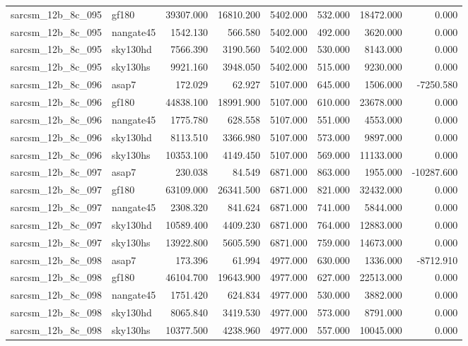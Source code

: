 \begin{tabular}{llrrrrrr}
sarcsm\_12b\_8c\_095 & gf180 & 39307.000 & 16810.200 & 5402.000 & 532.000 & 18472.000 & 0.000 \\
sarcsm\_12b\_8c\_095 & nangate45 & 1542.130 & 566.580 & 5402.000 & 492.000 & 3620.000 & 0.000 \\
sarcsm\_12b\_8c\_095 & sky130hd & 7566.390 & 3190.560 & 5402.000 & 530.000 & 8143.000 & 0.000 \\
sarcsm\_12b\_8c\_095 & sky130hs & 9921.160 & 3948.050 & 5402.000 & 515.000 & 9230.000 & 0.000 \\
sarcsm\_12b\_8c\_096 & asap7 & 172.029 & 62.927 & 5107.000 & 645.000 & 1506.000 & -7250.580 \\
sarcsm\_12b\_8c\_096 & gf180 & 44838.100 & 18991.900 & 5107.000 & 610.000 & 23678.000 & 0.000 \\
sarcsm\_12b\_8c\_096 & nangate45 & 1775.780 & 628.558 & 5107.000 & 551.000 & 4553.000 & 0.000 \\
sarcsm\_12b\_8c\_096 & sky130hd & 8113.510 & 3366.980 & 5107.000 & 573.000 & 9897.000 & 0.000 \\
sarcsm\_12b\_8c\_096 & sky130hs & 10353.100 & 4149.450 & 5107.000 & 569.000 & 11133.000 & 0.000 \\
sarcsm\_12b\_8c\_097 & asap7 & 230.038 & 84.549 & 6871.000 & 863.000 & 1955.000 & -10287.600 \\
sarcsm\_12b\_8c\_097 & gf180 & 63109.000 & 26341.500 & 6871.000 & 821.000 & 32432.000 & 0.000 \\
sarcsm\_12b\_8c\_097 & nangate45 & 2308.320 & 841.624 & 6871.000 & 741.000 & 5844.000 & 0.000 \\
sarcsm\_12b\_8c\_097 & sky130hd & 10589.400 & 4409.230 & 6871.000 & 764.000 & 12883.000 & 0.000 \\
sarcsm\_12b\_8c\_097 & sky130hs & 13922.800 & 5605.590 & 6871.000 & 759.000 & 14673.000 & 0.000 \\
sarcsm\_12b\_8c\_098 & asap7 & 173.396 & 61.994 & 4977.000 & 630.000 & 1336.000 & -8712.910 \\
sarcsm\_12b\_8c\_098 & gf180 & 46104.700 & 19643.900 & 4977.000 & 627.000 & 22513.000 & 0.000 \\
sarcsm\_12b\_8c\_098 & nangate45 & 1751.420 & 624.834 & 4977.000 & 530.000 & 3882.000 & 0.000 \\
sarcsm\_12b\_8c\_098 & sky130hd & 8065.840 & 3419.530 & 4977.000 & 573.000 & 8791.000 & 0.000 \\
sarcsm\_12b\_8c\_098 & sky130hs & 10377.500 & 4238.960 & 4977.000 & 557.000 & 10045.000 & 0.000 \\

\end{tabular}
